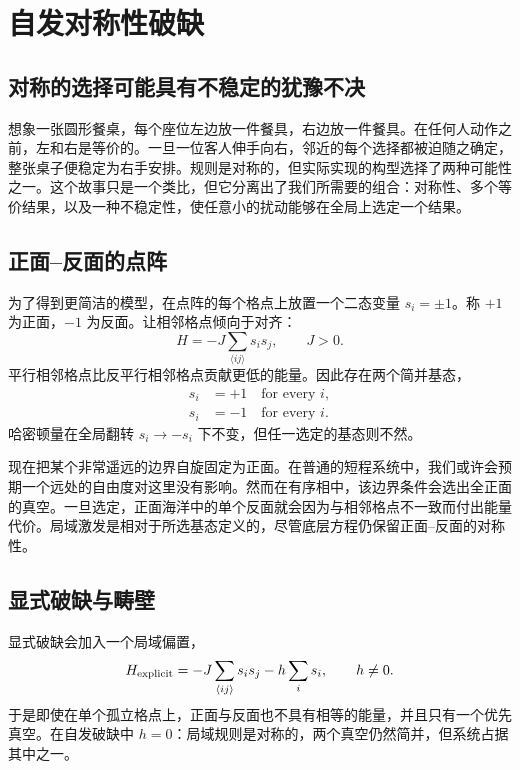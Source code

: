 \section{自发对称性破缺}

\subsection{对称的选择可能具有不稳定的犹豫不决}

想象一张圆形餐桌，每个座位左边放一件餐具，右边放一件餐具。在任何人动作之前，左和右是等价的。一旦一位客人伸手向右，邻近的每个选择都被迫随之确定，整张桌子便稳定为右手安排。规则是对称的，但实际实现的构型选择了两种可能性之一。这个故事只是一个类比，但它分离出了我们所需要的组合：对称性、多个等价结果，以及一种不稳定性，使任意小的扰动能够在全局上选定一个结果。

\subsection{正面--反面的点阵}

为了得到更简洁的模型，在点阵的每个格点上放置一个二态变量 \(s_i=\pm1\)。称 \(+1\) 为正面，\(-1\) 为反面。让相邻格点倾向于对齐：
\begin{equation}
  H=-J\sum_{\langle ij\rangle}s_i s_j,
  \qquad J>0.
\end{equation}
平行相邻格点比反平行相邻格点贡献更低的能量。因此存在两个简并基态，
\begin{equation}
\begin{aligned}
  s_i&=+1\quad\text{for every }i,
  \\
  s_i&=-1\quad\text{for every }i.
\end{aligned}
\end{equation}
哈密顿量在全局翻转 \(s_i\to-s_i\) 下不变，但任一选定的基态则不然。

现在把某个非常遥远的边界自旋固定为正面。在普通的短程系统中，我们或许会预期一个远处的自由度对这里没有影响。然而在有序相中，该边界条件会选出全正面的真空。一旦选定，正面海洋中的单个反面就会因为与相邻格点不一致而付出能量代价。局域激发是相对于所选基态定义的，尽管底层方程仍保留正面--反面的对称性。

\subsection{显式破缺与畴壁}

显式破缺会加入一个局域偏置，
\begin{equation}
  H_{\rm explicit}
  =-J\sum_{\langle ij\rangle}s_i s_j-h\sum_i s_i,
  \qquad h\ne0.
\end{equation}
于是即使在单个孤立格点上，正面与反面也不具有相等的能量，并且只有一个优先真空。在自发破缺中 \(h=0\)：局域规则是对称的，两个真空仍然简并，但系统占据其中之一。

